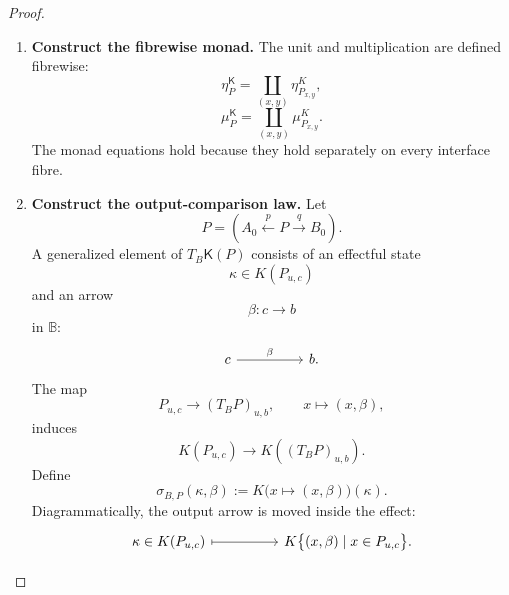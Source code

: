 \begin{proof}
    \leavevmode
    \begin{enumerate}
        \item \textbf{Construct the fibrewise monad.}
        The unit and multiplication are defined fibrewise:
        \[
            \eta^{\mathsf K}_P
            =
            \coprod_{(x,y)}
            \eta^K_{P_{x,y}},
        \]
        \[
            \mu^{\mathsf K}_P
            =
            \coprod_{(x,y)}
            \mu^K_{P_{x,y}}.
        \]
        The monad equations hold because they hold separately on every
        interface fibre.

        \item \textbf{Construct the output-comparison law.}
        Let
        \[
            P=
            \left(
                A_0\xleftarrow{p}P\xrightarrow{q}B_0
            \right).
        \]
        A generalized element of \(T_B\mathsf K(P)\) consists of an
        effectful state
        \[
            \kappa\in K(P_{u,c})
        \]
        and an arrow
        \[
            \beta:c\to b
        \]
        in \(\mathbb B\):
        \[
            \begin{tikzcd}[column sep=huge]
                    c
                        \arrow[r, "\beta"]
                &
                    b.
            \end{tikzcd}
        \]
        The map
        \[
            P_{u,c}
            \longrightarrow
            (T_BP)_{u,b},
            \qquad
            x\longmapsto(x,\beta),
        \]
        induces
        \[
            K(P_{u,c})
            \longrightarrow
            K((T_BP)_{u,b}).
        \]
        Define
        \[
            \sigma_{B,P}(\kappa,\beta)
            :=
            K\bigl(x\mapsto(x,\beta)\bigr)(\kappa).
        \]
        Diagrammatically, the output arrow is moved inside the effect:
        \[
            \begin{tikzcd}[column sep=huge]
                    \kappa\in K(P_{u,c})
                        \arrow[r, maps to]
                &
                    K\bigl\{
                        (x,\beta)
                        \mid
                        x\in P_{u,c}
                    \bigr\}.
            \end{tikzcd}
        \]


\end{enumerate}
\end{proof}
